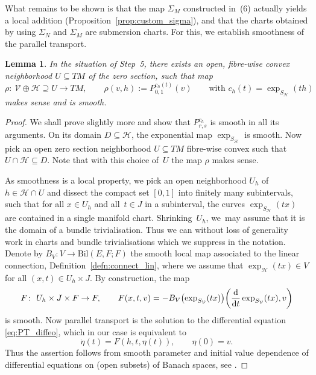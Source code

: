 \documentclass[pdftex]{sigma}
\numberwithin{equation}{section}
\newtheorem{Lemma}[Theorem]{Lemma}
\newcommand{\cH}{\ensuremath{\mathcal{H}}}
\newcommand{\cV}{\ensuremath{\mathcal{V}}}
\begin{document}
What remains to be shown is that the map $\Sigma_{M}$ constructed in~(6) actually yields a local addition (Proposition~\ref{prop:custom_sigma}), and that the charts obtained by using $\Sigma_{N}$ and $\Sigma_{M}$ are submersion charts.
For this, we establish smoothness of the parallel transport.

\begin{Lemma}\label{lem:smooth_aux}
In the situation of Step~{\rm 5}, there exists an open, fibre-wise convex neighborhood ${U \subseteq TM}$ of the zero section, such that map
\begin{displaymath}
\rho \colon \ \cV \oplus \cH \supseteq U \rightarrow TM, \qquad \rho (v,h) := P_{0,1}^{c_h(t)}(v) \qquad \text{with } c_h (t) = \exp_{S_{\cH}} (th)
\end{displaymath}
makes sense and is smooth.
\end{Lemma}

\begin{proof}
 We shall prove slightly more and show that $P_{r,s}^{c_h}$ is smooth in all its arguments.
On its domain $D\subseteq \cH$, the exponential map $\exp_{S_{\cH}}$ is smooth. Now pick an open zero section neighborhood $U\subseteq TM$ fibre-wise convex such that $U \cap \cH \subseteq D$. Note that with this choice of~$U$ the map $\rho$ makes sense.

As smoothness is a local property, we pick an open neighborhood $U_h$ of $h \in \cH \cap U$ and dissect the compact set $[0,1]$ into finitely many subintervals, such that for all $x\in U_h$ and all~${t \in J}$ in a subinterval, the curves $\exp_{S_\cH}(tx)$ are contained in a single manifold chart. Shrinking~${U_h}$, we~may assume that it is the domain of a bundle trivialisation. Thus we can without loss of generality work in charts and bundle trivialisations which we suppress in the notation. Denote by $B_V \colon V \rightarrow \text{Bil}(E , F; F)$ the smooth local map associated to the linear connection, Definition~\ref{defn:connect_lin}, where we assume that $\exp_\cH (tx)\in V$ for all $(x,t) \in U_h\times J$. By construction, the map
\begin{displaymath}F \colon\ U_h \times J \times F \rightarrow F, \qquad F(x,t,v) =- B_V\bigl(\exp_{S_{\cV}}(tx)\bigr)\biggl(\frac{{\rm d}}{{\rm d}t}\exp_{S_{\cV}}(tx),v\biggr)
\end{displaymath}
is smooth. Now parallel transport is the solution to the differential equation \eqref{eq:PT_diffeo}, which in our case is equivalent to
\begin{displaymath}
 \dot{\eta}(t) = F(h,t,\eta(t)), \qquad \eta(0)=v.
\end{displaymath}
Thus the assertion follows from smooth parameter and initial value dependence of differential equations on (open subsets) of Banach spaces, see \cite[Chapter~IV, Section~1]{La01}.
\end{proof}
\end{document}
